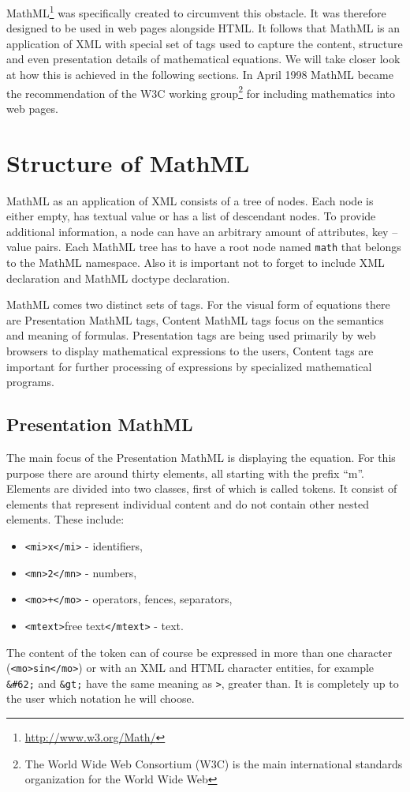 \documentclass[11pt,oneside,final]{fithesis2}
\begin{document}
MathML\footnote{\url{http://www.w3.org/Math/}} was specifically created to circumvent this obstacle. It was therefore designed to be used in web pages alongside HTML. It follows that MathML is an application of XML with special set of tags used to capture the content, structure and even presentation details of mathematical equations. We will take closer look at how this is achieved in the following sections. In April 1998 MathML became the recommendation of the W3C working group\footnote{The World Wide Web Consortium (W3C) is the main international standards organization for the World Wide Web} for including mathematics into web pages.

\section{Structure of MathML}
MathML as an application of XML consists of a tree of nodes. Each node is either empty, has textual value or has a list of descendant nodes. To provide additional information, a node can have an arbitrary amount of attributes, key – value pairs. Each MathML tree has to have a root node named \texttt{math} that belongs to the MathML namespace. Also it is important not to forget to include XML declaration and MathML doctype declaration. 

MathML comes two distinct sets of tags. For the visual form of equations there are Presentation MathML tags, Content MathML tags focus on the semantics and meaning of formulas. Presentation tags are being used primarily by web browsers to display mathematical expressions to the users, Content tags are important for further processing of expressions by specialized mathematical programs.

\subsection{Presentation MathML}
The main focus of the Presentation MathML is displaying the equation. For this purpose there are around thirty elements, all starting with the prefix “m”. Elements are divided into two classes, first of which is called tokens. It consist of elements that represent individual content and do not contain other nested elements. These include: 
\begin{itemize}
\item \texttt{<mi>x</mi>} - identifiers,
\item \texttt{<mn>2</mn>} - numbers,
\item \texttt{<mo>+</mo>} - operators, fences, separators,
\item \texttt{<mtext>}free text\texttt{</mtext>} - text.
\end{itemize}
The content of the token can of course be expressed in more than one character (\texttt{<mo>sin</mo>}) or with an XML and HTML character entities, for example \texttt{\&\#62;} and \texttt{\&gt;} have the same meaning as \texttt{>}, greater than. It is completely up to the user which notation he will choose.
\end{document}
